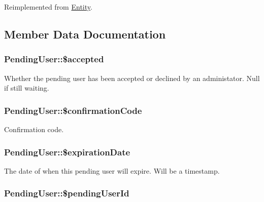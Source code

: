 Reimplemented from \hyperlink{classEntity_a8305fd94740ac62cbafb9de76567ce37}{Entity}.



\subsection{Member Data Documentation}
\hypertarget{classPendingUser_a01579e15e9b634948455543a9f55a7c0}{
\subsubsection[{\$accepted}]{\setlength{\rightskip}{0pt plus 5cm}PendingUser::\$accepted}}
\label{classPendingUser_a01579e15e9b634948455543a9f55a7c0}
Whether the pending user has been accepted or declined by an administator. Null if still waiting. \hypertarget{classPendingUser_af0819189ce856cdde304084503839520}{
\subsubsection[{\$confirmationCode}]{\setlength{\rightskip}{0pt plus 5cm}PendingUser::\$confirmationCode}}
\label{classPendingUser_af0819189ce856cdde304084503839520}
Confirmation code. \hypertarget{classPendingUser_a0319c006a79b51b47ef224fba80bf7c7}{
\subsubsection[{\$expirationDate}]{\setlength{\rightskip}{0pt plus 5cm}PendingUser::\$expirationDate}}
\label{classPendingUser_a0319c006a79b51b47ef224fba80bf7c7}
The date of when this pending user will expire. Will be a timestamp. \hypertarget{classPendingUser_a3555aa718d233a642bf6d72cf4f2b3b6}{
\subsubsection[{\$pendingUserId}]{\setlength{\rightskip}{0pt plus 5cm}PendingUser::\$pendingUserId}}
